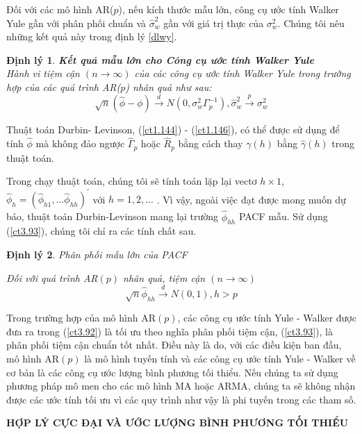 \documentclass[12pt, a4paper,oneside]{book}
\newtheorem{theo}{\bf Định lý}[section]
\theoremstyle{definition}
\begin{document}
Đối với các mô hình AR($ p $), nếu kích thước mẫu lớn, công cụ ước tính Walker Yule gần với phân phối chuẩn và $ \hat{\sigma}_{w}^{2} $ gần với giá trị thực của $ \sigma_{w}^{2} $. Chúng tôi nêu những kết quả này trong định lý \ref{dlwy}.
\begin{theo}
\textbf{\label{dlwy}Kết quả mẫu lớn cho Công cụ ước tính Walker Yule}\\	
Hành vi tiệm cận $ (n \longrightarrow\infty) $ của các công cụ ước tính Walker Yule trong trường hợp của các quá trình AR($ p $) nhân quả như sau:
\begin{equation}
\sqrt{n}(\hat{\phi}-\phi) \xrightarrow{d} N(0,\sigma_{w}^2\Gamma_{p}^{-1}),  \hat{\sigma}_{w}^2 \xrightarrow{p} \sigma_{w}^2 \label{ct3.93}
\end{equation}  	
\end{theo}
Thuật toán  Durbin- Levinson, (\ref{ct1.144}) - (\ref{ct1.146}), có thể được sử dụng để tính $ \hat{\phi} $ mà không đảo ngược $ \hat{\Gamma}_{p} $ hoặc $ \hat{R}_{p} $ bằng cách thay $ \gamma(h) $ bằng $ \hat{\gamma}(h) $ trong thuật toán.  

Trong chạy thuật toán, chúng tôi sẽ tính toán lặp lại vectơ $ h \times 1 $, $\hat{\phi}_{h}=(\hat{\phi}_{h1},...\hat{\phi}_{hh})^{\prime}  $ với $ h = 1, 2 ,... $ . Vì vậy, ngoài việc đạt được mong muốn dự báo, thuật toán Durbin-Levinson mang lại trường $ \hat{\phi}_{hh} $ PACF mẫu. Sử dụng (\ref{ct3.93}), chúng tôi chỉ ra các tính chất sau.
\begin{theo}
	Phân phối mẫu lớn của PACF
	
	Đối với quá trình AR$(p)$ nhân quả, tiệm cận $ (n \longrightarrow\infty) $
	\begin{equation}
	\sqrt{n}\hat{\phi}_{hh} \xrightarrow{d} N(0,1), h>p   \label{ct3.94}
	\end{equation}
\end{theo}

Trong trường hợp của mô hình AR$(p)$, các công cụ ước tính Yule - Walker được đưa ra trong (\ref{ct3.92}) là tối ưu theo nghĩa phân phối tiệm cận, (\ref{ct3.93}), là phân phối tiệm cận chuẩn tốt nhất. Điều này là do, với các điều kiện ban đầu, mô hình AR$(p)$ là mô hình tuyến tính và các công cụ ước tính Yule - Walker về cơ bản là các công cụ ước lượng bình phương tối thiểu. Nếu chúng ta sử dụng phương pháp mô men cho các mô hình MA hoặc ARMA, chúng ta sẽ không nhận được các ước tính tối ưu vì các quy trình như vậy là phi tuyến trong các tham số.

\textbf{HỢP LÝ CỰC ĐẠI VÀ  ƯỚC LƯỢNG  BÌNH PHƯƠNG TỐI THIỂU}
\end{document}
